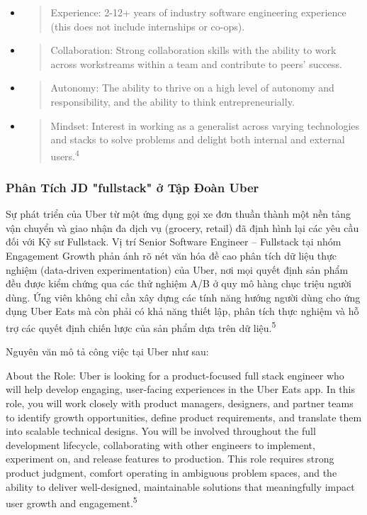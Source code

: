 \documentclass[12pt,a4paper]{article}
\begin{document}
\begin{itemize}
\item
  \begin{quote}
  Experience: 2-12+ years of industry software engineering experience
  (this does not include internships or co-ops).
  \end{quote}
\item
  \begin{quote}
  Collaboration: Strong collaboration skills with the ability to work
  across workstreams within a team and contribute to peers' success.
  \end{quote}
\item
  \begin{quote}
  Autonomy: The ability to thrive on a high level of autonomy and
  responsibility, and the ability to think entrepreneurially.
  \end{quote}
\item
  \begin{quote}
  Mindset: Interest in working as a generalist across varying
  technologies and stacks to solve problems and delight both internal
  and external users.\textsuperscript{4}
  \end{quote}
\end{itemize}

\subsubsection{Phân Tích JD "fullstack" ở Tập Đoàn Uber}

Sự phát triển của Uber từ một ứng dụng gọi xe đơn thuần thành một nền
tảng vận chuyển và giao nhận đa dịch vụ (grocery, retail) đã định hình
lại các yêu cầu đối với Kỹ sư Fullstack. Vị trí Senior Software
Engineer -- Fullstack tại nhóm Engagement Growth phản ánh rõ nét văn
hóa đề cao phân tích dữ liệu thực nghiệm (data-driven experimentation)
của Uber, nơi mọi quyết định sản phẩm đều được kiểm chứng qua các thử
nghiệm A/B ở quy mô hàng chục triệu người dùng. Ứng viên không chỉ cần
xây dựng các tính năng hướng người dùng cho ứng dụng Uber Eats mà còn
phải có khả năng thiết lập, phân tích thực nghiệm và hỗ trợ các quyết
định chiến lược của sản phẩm dựa trên dữ liệu.\textsuperscript{5}

Nguyên văn mô tả công việc tại Uber như sau:

About the Role: Uber is looking
for a product-focused full stack engineer who will help develop
engaging, user-facing experiences in the Uber Eats app. In this role,
you will work closely with product managers, designers, and partner
teams to identify growth opportunities, define product requirements, and
translate them into scalable technical designs. You will be involved
throughout the full development lifecycle, collaborating with other
engineers to implement, experiment on, and release features to
production. This role requires strong product judgment, comfort
operating in ambiguous problem spaces, and the ability to deliver
well-designed, maintainable solutions that meaningfully impact user
growth and engagement.\textsuperscript{5}
\end{document}
